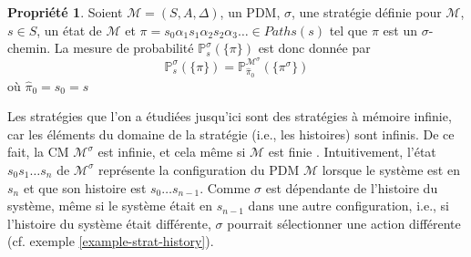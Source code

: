 \documentclass[12pt,a4paper]{report}
\theoremstyle{definition}%
\newtheorem{propriete}{Propriété}[chapter]
\theoremstyle{remark}
\newcommand{\pr}{\mathbb{P}}
\begin{document}
\begin{propriete}
Soient $\mathcal{M} = (S, A, \Delta)$, un PDM, $\sigma$, une stratégie définie pour
$\mathcal{M}$, $s \in S$, un état de $\mathcal{M}$ et $\pi = s_0 \alpha_1 s_1 \alpha_2 s_2 \alpha_3 \dots \in Paths(s)$ tel que $\pi$ est un $\sigma$-chemin. La
mesure de probabilité $\pr^\sigma_s(\{\pi\})$ est donc donnée par
\[
		\pr^\sigma_s(\{\pi\}) = \pr^{\mathcal{M}^\sigma}_{\hat{\pi}_0}(\{\pi^\sigma\})
\]
où $\hat{\pi}_0 = s_0 = s$
\end{propriete}
Les stratégies que l'on a étudiées jusqu'ici sont des stratégies à mémoire infinie, car les éléments du domaine de la stratégie (i.e., les histoires) sont infinis. De ce fait, la CM $\mathcal{M}^\sigma$ est infinie, et cela
même si $\mathcal{M}$ est finie%
. Intuitivement, l'état $s_0 s_1 \dots s_n$ de
$\mathcal{M}^\sigma$ représente la configuration du PDM $\mathcal{M}$ lorsque
le système est en $s_n$ et que son histoire est $s_0 \dots s_{n-1}$. Comme
$\sigma$ est dépendante de l'histoire du système, même si le système était en $s_{n-1}$ dans une autre configuration, i.e., si l'histoire du système était
différente, $\sigma$ pourrait sélectionner une action
différente (cf. exemple \ref{example-strat-history}).
\end{document}
